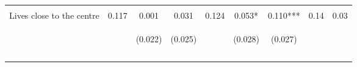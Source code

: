 \begin{tabular}{lcccccccc}
 & \begin{footnotesize}\end{footnotesize} & \begin{footnotesize}[0.041]\end{footnotesize} & \begin{footnotesize}[0.001]\end{footnotesize} & \begin{footnotesize}\end{footnotesize} & \begin{footnotesize}[1.000]\end{footnotesize} & \begin{footnotesize}[0.371]\end{footnotesize} & \begin{footnotesize}\end{footnotesize} & \begin{footnotesize}\end{footnotesize}\\
\noalign{\smallskip}Lives close to the centre & 0.117 & 0.001 & 0.031 & 0.124 & 0.053* & 0.110*** & 0.14 & 0.03\\
 & \begin{footnotesize}\end{footnotesize} & \begin{footnotesize}(0.022)\end{footnotesize} & \begin{footnotesize}(0.025)\end{footnotesize} & \begin{footnotesize}\end{footnotesize} & \begin{footnotesize}(0.028)\end{footnotesize} & \begin{footnotesize}(0.027)\end{footnotesize} & \begin{footnotesize}\end{footnotesize} & \begin{footnotesize}\end{footnotesize}\\
 & \begin{footnotesize}\end{footnotesize} & \begin{footnotesize}[0.240]\end{footnotesize} & \begin{footnotesize}[0.046]\end{footnotesize} & \begin{footnotesize}\end{footnotesize} & \begin{footnotesize}[0.435]\end{footnotesize} & \begin{footnotesize}[0.001]\end{footnotesize} & \begin{footnotesize}\end{footnotesize} & \begin{footnotesize}\end{footnotesize}\\
\noalign{\smallskip}\hline\end{tabular}
